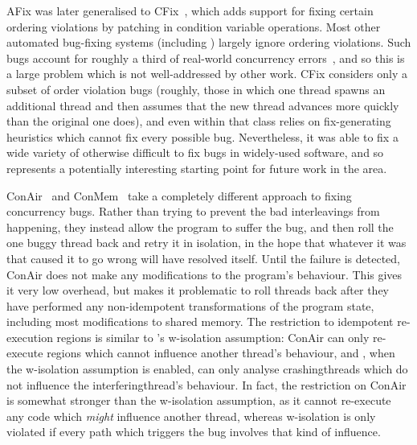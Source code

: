 AFix was later generalised to CFix~\cite{Jin2012}, which adds support
for fixing certain ordering violations by patching in condition
variable operations.  Most other automated bug-fixing systems
(including {\technique}) largely ignore ordering violations.  Such
bugs account for roughly a third of real-world concurrency
errors~\cite{Lu2008}, and so this is a large problem which is not
well-addressed by other work.  CFix considers only a subset of order
violation bugs (roughly, those in which one thread spawns an
additional thread and then assumes that the new thread advances more
quickly than the original one does), and even within that class relies
on fix-generating heuristics which cannot fix every possible bug.
Nevertheless, it was able to fix a wide variety of otherwise difficult
to fix bugs in widely-used software, and so represents a potentially
interesting starting point for future work in the area.

ConAir~\cite{Zhang2013} and ConMem~\cite{Zhang2010} take a completely
different approach to fixing concurrency bugs.  Rather than trying to
prevent the bad interleavings from happening, they instead allow the
program to suffer the bug, and then roll the one buggy thread back and
retry it in isolation, in the hope that whatever it was that caused it
to go wrong will have resolved itself.  Until the failure is detected,
ConAir does not make any modifications to the program's behaviour.
This gives it very low overhead, but makes it problematic to roll
threads back after they have performed any non-idempotent
transformations of the program state, including most modifications to
shared memory.  The restriction to idempotent re-execution regions is
similar to {\technique}'s \gls{w-isolation} assumption: ConAir can
only re-execute regions which cannot influence another thread's
behaviour, and {\technique}, when the \gls{w-isolation} assumption is
enabled, can only analyse \glspl{crashingthread} which do not
influence the \gls{interferingthread}'s behaviour.  In fact, the
restriction on ConAir is somewhat stronger than the \gls{w-isolation}
assumption, as it cannot re-execute any code which \emph{might}
influence another thread, whereas \gls{w-isolation} is only violated
if every path which triggers the bug involves that kind of influence.

